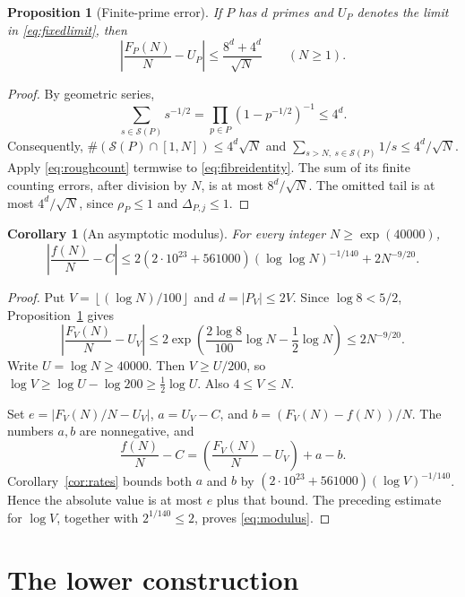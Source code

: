 \documentclass[11pt]{amsart}
\newtheorem{proposition}[theorem]{Proposition}
\newtheorem{corollary}[theorem]{Corollary}
\theoremstyle{definition}
\theoremstyle{remark}
\numberwithin{equation}{section}
\newcommand{\Sp}{\mathcal S}
\newcommand{\floor}[1]{\left\lfloor #1\right\rfloor}
\begin{document}
\begin{proposition}[Finite-prime error]\label{prop:finiteerror}
If $P$ has $d$ primes and $U_P$ denotes the limit in \eqref{eq:fixedlimit}, then
\begin{equation}\label{eq:finiteerror}
\left|\frac{F_P(N)}N-U_P\right|\le\frac{8^d+4^d}{\sqrt N}\qquad(N\ge1).
\end{equation}
\end{proposition}

\begin{proof}
By geometric series,
\[
\sum_{s\in\Sp(P)}s^{-1/2}
=\prod_{p\in P}(1-p^{-1/2})^{-1}\le4^d.
\]
Consequently, $\#(\Sp(P)\cap[1,N])\le4^d\sqrt N$ and
$\sum_{s>N,\ s\in\Sp(P)}1/s\le4^d/\sqrt N$.
Apply \eqref{eq:roughcount} termwise to \eqref{eq:fibreidentity}.
The sum of its finite counting errors, after division by $N$, is at most $8^d/\sqrt N$.
The omitted tail is at most $4^d/\sqrt N$, since $\rho_P\le1$ and $\Delta_{P,j}\le1$.
\end{proof}

\begin{corollary}[An asymptotic modulus]\label{cor:modulus}
For every integer $N\ge\exp(40000)$,
\begin{equation}\label{eq:modulus}
\left|\frac{f(N)}N-C\right|
\le2(2\cdot10^{23}+561000)(\log\log N)^{-1/140}+2N^{-9/20}.
\end{equation}
\end{corollary}

\begin{proof}
Put $V=\floor{(\log N)/100}$ and $d=|P_V|\le2V$.
Since $\log8<5/2$, Proposition~\ref{prop:finiteerror} gives
\[
\left|\frac{F_V(N)}N-U_V\right|
\le2\exp\left(\frac{2\log8}{100}\log N-\frac12\log N\right)
\le2N^{-9/20}.
\]
Write $U=\log N\ge40000$.
Then $V\ge U/200$, so
$\log V\ge\log U-\log200\ge\tfrac12\log U$.
Also $4\le V\le N$.

Set $e=|F_V(N)/N-U_V|$, $a=U_V-C$, and $b=(F_V(N)-f(N))/N$.
The numbers $a,b$ are nonnegative, and
\[
\frac{f(N)}N-C=\left(\frac{F_V(N)}N-U_V\right)+a-b.
\]
Corollary~\ref{cor:rates} bounds both $a$ and $b$ by
$(2\cdot10^{23}+561000)(\log V)^{-1/140}$.
Hence the absolute value is at most $e$ plus that bound.
The preceding estimate for $\log V$, together with $2^{1/140}\le2$, proves \eqref{eq:modulus}.
\end{proof}

\section{The lower construction}\label{sec:lower}
\end{document}
